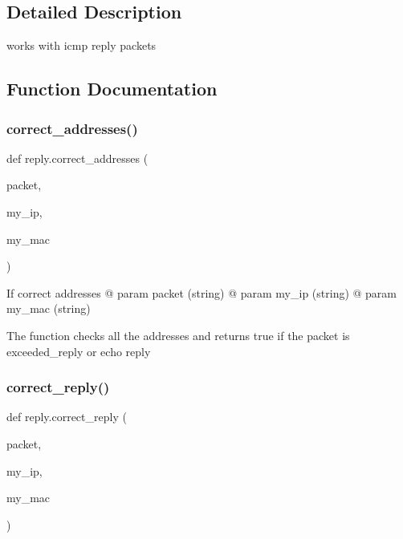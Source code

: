 \subsection{Detailed Description}
\begin{DoxyVerb}works with icmp reply packets \end{DoxyVerb}
 

\subsection{Function Documentation}
\mbox{\label{namespacereply_ad9c1e99c3980b4b1dfd1f7a6a5bb8683}} 
\subsubsection{\texorpdfstring{correct\+\_\+addresses()}{correct\_addresses()}}
{\footnotesize\ttfamily def reply.\+correct\+\_\+addresses (\begin{DoxyParamCaption}\item[{}]{packet,  }\item[{}]{my\+\_\+ip,  }\item[{}]{my\+\_\+mac }\end{DoxyParamCaption})}



If correct addresses @ param packet (string) @ param my\+\_\+ip (string) @ param my\+\_\+mac (string) 

The function checks all the addresses and returns true if the packet is exceeded\+\_\+reply or echo reply \mbox{\label{namespacereply_a8fecb9b3744fbc25a42bcbb747e641fa}} 
\subsubsection{\texorpdfstring{correct\+\_\+reply()}{correct\_reply()}}
{\footnotesize\ttfamily def reply.\+correct\+\_\+reply (\begin{DoxyParamCaption}\item[{}]{packet,  }\item[{}]{my\+\_\+ip,  }\item[{}]{my\+\_\+mac }\end{DoxyParamCaption})}



